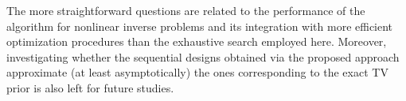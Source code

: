 \documentclass[final]{siamltex}
\begin{document}
The more straightforward questions are related to the performance of the algorithm for nonlinear inverse problems and its integration with more efficient optimization procedures than the exhaustive search employed here. Moreover, investigating whether the sequential designs obtained via the proposed approach approximate (at least asymptotically) the ones corresponding to the exact TV prior is also left for future studies.



\end{document}
